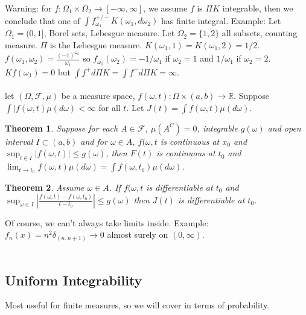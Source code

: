 \documentclass[12pt]{article}
\newtheorem{theorem}{Theorem}
\begin{document}
Warning: for $f : \Omega_1 \times \Omega_2 \rightarrow [-\infty, \infty]$, we assume $f$ is $\Pi K$ integrable, then we conclude that one of $\int f_{\omega_1}^{+/-} K(\omega_1, d \omega_2)$ has finite integral.
Example: Let $\Omega_1 = (0, 1]$, Borel sets, Lebesgue measure.  Let $\Omega_2 = \{1, 2\}$ all subsets, counting measure.  $\Pi$ is the Lebesgue measure.  $K(\omega_1, 1) = K(\omega_1, 2) = 1/2$.  $f(\omega_1, \omega_2) = \frac{(-1)^{\omega_2}}{\omega_1}$ so $f_{\omega_1} (\omega_2) = -1/\omega_1$ if $\omega_2 = 1$ and $1/ \omega_1$ if $\omega_2 = 2$.  $K f (\omega_1) = 0$ but $\int f^+ d \Pi K = \int f^- d \Pi K = \infty$.
\\ \\
let $(\Omega, \mathcal{F}, \mu)$ be a measure space, $f(\omega, t) : \Omega \times (a,b) \rightarrow \mathbb{R}$.  Suppose $\int |f(\omega, t) \mu (d \omega) < \infty$ for all $t$.  Let $J(t) = \int f(\omega, t) \mu( d\omega)$.
\begin{theorem}
Suppose for each $A \in \mathcal{F}$, $\mu(A^C) = 0$, integrable $g(\omega)$ and open interval $I \subset (a,b)$ and for $\omega \in A$, $f(\omega, t$ is continuous at $x_0$ and $\sup_{t \in I} | f(\omega, t) | \le g(\omega)$, then $F(t)$ is continuous at $t_0$ and $\lim_{t \to t_0} f(\omega, t) \mu(d\omega) = \int f(\omega, t_0) \mu(d \omega)$.
\end{theorem}
\begin{theorem}
Assume $\omega \in A$.  If $f(\omega, t$ is differentiable at $t_0$ and $\sup_{\omega \in I} | \frac{ f(\omega, t) - f(\omega, t_0) }{t - t_0} | \le g(\omega)$ then $J(t)$ is differentiable at $t_0$.
\end{theorem}

Of course, we can't always take limits inside.  Example: $f_n(x) = n^2 \delta_{(n, n+1)} \to 0$ almost surely on $(0, \infty)$.
\\ \\
\subsection{Uniform Integrability}
Most useful for finite measures, so we will cover in terms of probability.
\end{document}
